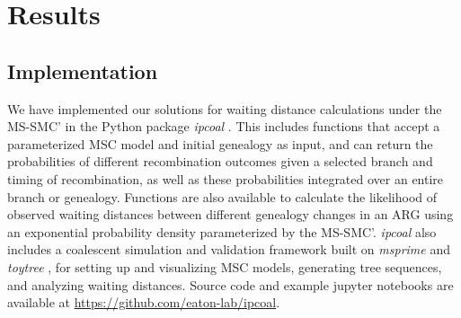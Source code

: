 \documentclass[11pt]{article}
\begin{document}


\section{Results}

\subsection{Implementation}
We have implemented our solutions for waiting distance calculations
under the MS-SMC' in the Python package \emph{ipcoal} \citep{mckenzie_ipcoal_2020}.
This includes functions that accept a parameterized MSC model and 
initial genealogy as input, and can return the probabilities of different 
recombination outcomes given a selected branch and timing of recombination, 
as well as these probabilities integrated over an entire branch or genealogy. 
Functions are also available to calculate the likelihood of observed 
waiting distances between different genealogy changes in an ARG 
using an exponential probability density parameterized by the MS-SMC'.
\emph{ipcoal} also includes a coalescent simulation and validation 
framework built on \emph{msprime} \citep{baumdicker_efficient_2022}
and \emph{toytree} \citep{eaton_toytree_2020}, for setting up and 
visualizing MSC models, generating tree sequences, and analyzing waiting
distances. Source code and example jupyter notebooks are available at
\url{https://github.com/eaton-lab/ipcoal}.
\end{document}
